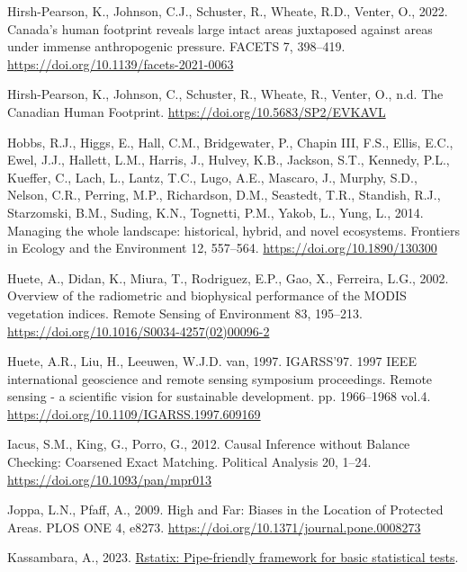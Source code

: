 \documentclass[
]{agujournal2019}
\newlength{\cslhangindent}
\newenvironment{CSLReferences}[2] %
 {\begin{list}{}{%
  \setlength{\itemindent}{0pt}
  \setlength{\leftmargin}{0pt}
  \setlength{\parsep}{0pt}
  \ifodd #1
   \setlength{\leftmargin}{\cslhangindent}
   \setlength{\itemindent}{-1\cslhangindent}
  \fi
  \setlength{\itemsep}{#2\baselineskip}}}
 {\end{list}}
\begin{document}
\begin{CSLReferences}{1}{0}
Hirsh-Pearson, K., Johnson, C.J., Schuster, R., Wheate, R.D., Venter,
O., 2022. Canada{'}s human footprint reveals large intact areas
juxtaposed against areas under immense anthropogenic pressure. FACETS 7,
398--419. \url{https://doi.org/10.1139/facets-2021-0063}

Hirsh-Pearson, K., Johnson, C., Schuster, R., Wheate, R., Venter, O.,
n.d. The Canadian Human Footprint.
\url{https://doi.org/10.5683/SP2/EVKAVL}

Hobbs, R.J., Higgs, E., Hall, C.M., Bridgewater, P., Chapin III, F.S.,
Ellis, E.C., Ewel, J.J., Hallett, L.M., Harris, J., Hulvey, K.B.,
Jackson, S.T., Kennedy, P.L., Kueffer, C., Lach, L., Lantz, T.C., Lugo,
A.E., Mascaro, J., Murphy, S.D., Nelson, C.R., Perring, M.P.,
Richardson, D.M., Seastedt, T.R., Standish, R.J., Starzomski, B.M.,
Suding, K.N., Tognetti, P.M., Yakob, L., Yung, L., 2014. Managing the
whole landscape: historical, hybrid, and novel ecosystems. Frontiers in
Ecology and the Environment 12, 557--564.
\url{https://doi.org/10.1890/130300}

Huete, A., Didan, K., Miura, T., Rodriguez, E.P., Gao, X., Ferreira,
L.G., 2002. Overview of the radiometric and biophysical performance of
the MODIS vegetation indices. Remote Sensing of Environment 83,
195--213. \url{https://doi.org/10.1016/S0034-4257(02)00096-2}

Huete, A.R., Liu, H., Leeuwen, W.J.D. van, 1997. IGARSS'97. 1997 IEEE
international geoscience and remote sensing symposium proceedings.
Remote sensing - a scientific vision for sustainable development. pp.
1966--1968 vol.4. \url{https://doi.org/10.1109/IGARSS.1997.609169}

Iacus, S.M., King, G., Porro, G., 2012. Causal Inference without Balance
Checking: Coarsened Exact Matching. Political Analysis 20, 1--24.
\url{https://doi.org/10.1093/pan/mpr013}

Joppa, L.N., Pfaff, A., 2009. High and Far: Biases in the Location of
Protected Areas. PLOS ONE 4, e8273.
\url{https://doi.org/10.1371/journal.pone.0008273}

Kassambara, A., 2023.
\href{https://rpkgs.datanovia.com/rstatix/}{Rstatix: Pipe-friendly
framework for basic statistical tests}.


\end{CSLReferences}
\end{document}
